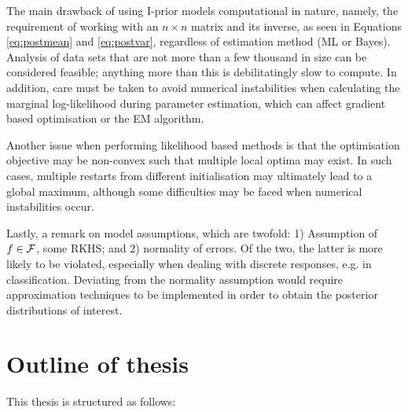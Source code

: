 \documentclass[a4paper,showframe,11pt]{report}
\begin{document}
The main drawback of using I-prior models computational in nature, namely, the requirement of working with an $n \times n$ matrix and its inverse, as seen in Equations \cref{eq:postmean} and \cref{eq:postvar}, regardless of estimation method (ML or Bayes).
Analysis of data sets that are not more than a few thousand in size can be considered feasible; anything more than this is debilitatingly slow to compute.
In addition, care must be taken to avoid numerical instabilities when calculating the marginal log-likelihood during parameter estimation, which can affect gradient based optimisation or the EM algorithm.

Another issue when performing likelihood based methods is that the optimisation objective may be non-convex such that multiple local optima may exist. 
In such cases, multiple restarts from different initialisation may ultimately lead to a global maximum, although some difficulties may be faced when numerical instabilities occur.

Lastly, a remark on model assumptions, which are twofold: 1) Assumption of $f \in {\mathcal F}$, some RKHS; and 2) normality of errors.
Of the two, the latter is more likely to be violated, especially when dealing with discrete responses, e.g. in classification.
Deviating from the normality assumption would require approximation techniques to be implemented in order to obtain the posterior distributions of interest.

\section{Outline of thesis}

This thesis is structured as follows:
\end{document}
